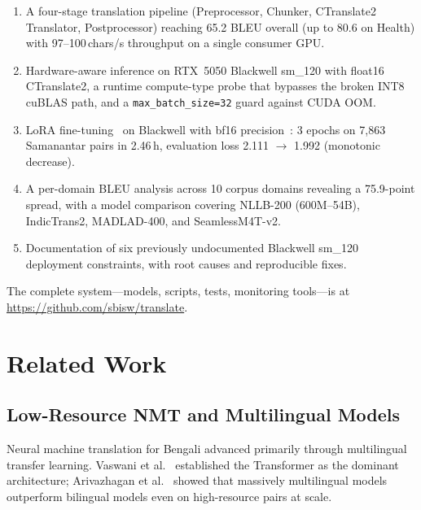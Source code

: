 \documentclass[journal]{IEEEtran}
\newcommand{\TRAINDURATION}{2.46\,h}
\begin{document}
\begin{enumerate}
  \item A four-stage translation pipeline (Preprocessor, Chunker, CTranslate2
        Translator, Postprocessor) reaching 65.2 BLEU overall (up to 80.6 on Health)
        with 97--100\,chars/s throughput on a single consumer GPU.

  \item Hardware-aware inference on RTX~5050 Blackwell sm\_120 with float16
        CTranslate2, a runtime compute-type probe that bypasses the broken INT8
        cuBLAS path, and a \texttt{max\_batch\_size=32} guard against CUDA OOM.

  \item LoRA fine-tuning~\cite{hu2021lora} on Blackwell with bf16
        precision~\cite{micikevicius2018mixed}: 3 epochs on 7,863 Samanantar pairs
        in \TRAINDURATION, evaluation loss 2.111 $\to$ 1.992 (monotonic decrease).

  \item A per-domain BLEU analysis across 10 corpus domains revealing a 75.9-point
        spread, with a model comparison covering NLLB-200 (600M--54B), IndicTrans2,
        MADLAD-400, and SeamlessM4T-v2.

  \item Documentation of six previously undocumented Blackwell sm\_120 deployment
        constraints, with root causes and reproducible fixes.
\end{enumerate}

The complete system---models, scripts, tests, monitoring tools---is at
\url{https://github.com/sbisw/translate}.

\section{Related Work}
\label{sec:related}

\subsection{Low-Resource NMT and Multilingual Models}

Neural machine translation for Bengali advanced primarily through multilingual
transfer learning.
Vaswani et al.~\cite{vaswani2017attention} established the Transformer as the
dominant architecture; Arivazhagan et al.~\cite{arivazhagan2019massively} showed
that massively multilingual models outperform bilingual models even on high-resource
pairs at scale.
\end{document}
